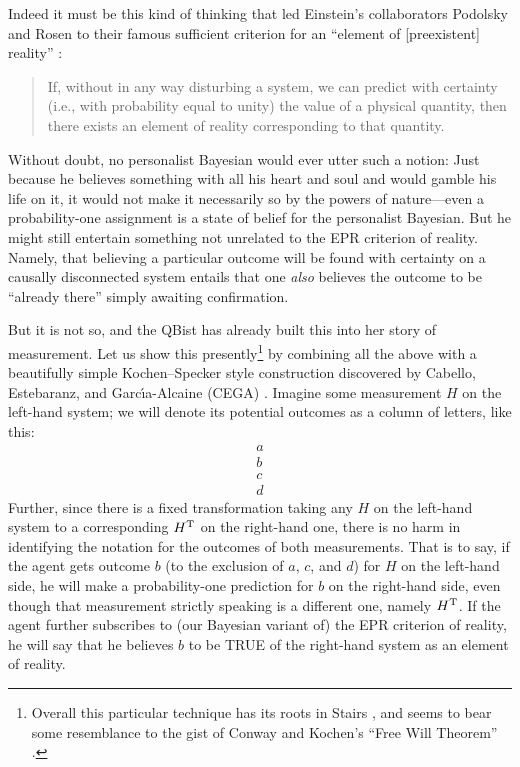 \documentclass[aps,pra,superscriptaddress,10pt,tightenlines,twocolumn,nofootinbib]{revtex4}
\newcommand{\veec}[4]{%
\begin{array}{c}{\!\!#1\!\!}\\{\!\!#2\!\!}\\{\!\!#3\!\!}\\{\!\!#4\!\!}\end{array}}
\begin{document}
Indeed it must be this kind of thinking that led Einstein's collaborators Podolsky and Rosen to their famous sufficient criterion for an ``element of [preexistent] reality'' \cite{Fine96}:
\begin{quote}
\noindent If, without in any way disturbing a system, we can predict with certainty (i.e., with probability equal to unity) the value of a physical quantity, then there exists an element of reality corresponding to that quantity.
\end{quote}
Without doubt, no personalist Bayesian would ever utter such a notion:  Just because he believes something with all his heart and soul and would gamble his life on it, it would not make it necessarily so by the powers of nature---even a probability-one assignment is a state of belief for the personalist Bayesian.  But he might still entertain something not unrelated to the EPR criterion of reality.  Namely, that believing a particular outcome will be found with certainty on a causally disconnected system entails that one {\it also\/} believes the outcome to be ``already there'' simply awaiting confirmation.

But it is not so, and the QBist has already built this into her story of measurement.  Let us show this presently\footnote{Overall this particular technique has its roots in Stairs \cite{Stairs83}, and seems to bear some resemblance to the gist of Conway and Kochen's ``Free Will Theorem'' \cite{Conway06,Conway09}. } by combining all the above with a beautifully simple Kochen--Specker style construction discovered by Cabello, Estebaranz, and Garc\'{\i}a-Alcaine (CEGA) \cite{Cabello97}.  Imagine some measurement $H$ on the left-hand system; we will denote its potential outcomes as a column of letters, like this:
\begin{equation}
\veec abcd
\end{equation}
Further, since there is a fixed transformation taking any $H$ on the left-hand system to a corresponding $H^{\rm T}$ on the right-hand one, there is no harm in identifying the notation for the outcomes of both measurements.  That is to say, if the agent gets outcome $b$ (to the exclusion of $a$, $c$, and $d$) for $H$ on the left-hand side, he will make a probability-one prediction for $b$ on the right-hand side, even though that measurement strictly speaking is a different one, namely $H^{\rm T}$.  If the agent further subscribes to (our Bayesian variant of) the EPR criterion of reality, he will say that he believes $b$ to be TRUE of the right-hand system as an element of reality.
\end{document}
